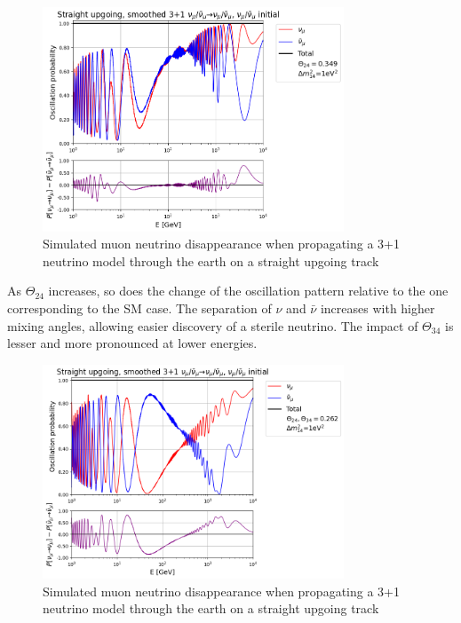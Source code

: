 \documentclass[a4paper,12pt,numbered]{article}
\begin{document}
\begin{figure}[H]
\centering
\includegraphics[width=0.8\textwidth]{Graphics/SterileOscParameters/0.349_th24_smoothed_osc_diff_mu.png}
\caption{Simulated muon neutrino disappearance when propagating a 3+1 neutrino model through the earth on a straight upgoing track}
\end{figure}

As $\Theta_{24}$ increases, so does the change of the oscillation pattern relative to the one corresponding to the SM case. The separation of $\nu$ and $\bar{\nu}$ increases with higher mixing angles, allowing easier discovery of a sterile neutrino. The impact of $\Theta_{34}$ is lesser and more pronounced at lower energies.

\begin{figure}[H]
\centering
\includegraphics[width=0.8\textwidth]{Graphics/SterileOscParameters/0.262_th2434_smoothed_osc_diff_mu.png}
\caption{Simulated muon neutrino disappearance when propagating a 3+1 neutrino model through the earth on a straight upgoing track}
\end{figure}
\end{document}
